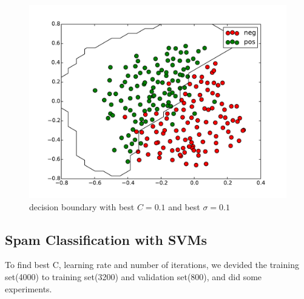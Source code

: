 \documentclass{article}
\begin{document}
\begin{figure}[H]
	\centering
	\includegraphics[width=1\linewidth]{./fig6}
	\caption{decision boundary with best $C=0.1$ and best $\sigma = 0.1$}\label{fig:3.2}
\end{figure}


\subsection{Spam Classification with SVMs}
To find best C, learning rate and number of iterations, we devided the training set(4000) to training set(3200) and validation set(800), and did some experiments.\\
\end{document}
